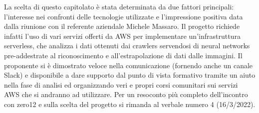 La scelta di questo capitolato è stata determinata da due fattori principali: l'interesse nei confronti delle tecnologie utilizzate e l'impressione positiva data dalla riunione con il referente aziendale Michele Massaro.
Il progetto richiede infatti l'uso di vari servizi offerti da AWS per implementare un'infrastruttura serverless, che analizza i dati ottenuti dai crawlers servendosi di neural networks pre-addestrate al riconoscimento e all'estrapolazione di dati dalle immagini. \newline
Il proponente si è dimostrato veloce nella comunicazione (fornendo anche un canale Slack) e disponibile a dare supporto dal punto di vista formativo tramite un aiuto nella fase di analisi ed organizzando veri e propri corsi comunitari sui servizi AWS che si andranno ad utilizzare.
Per un resoconto più completo dell'incontro con zero12 e sulla scelta del progetto si rimanda al verbale numero 4 (16/3/2022).
